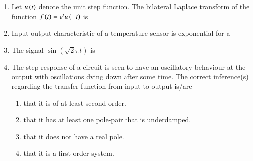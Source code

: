\documentclass[journal,12pt,onecolumn]{IEEEtran}
\theoremstyle{remark}
\begin{document}
\begin{enumerate}
\item Let $u\left(t\right)$ denote the unit step function. The bilateral Laplace transform of the function $f\left(t\right) = e^t u\left(-t\right)$ is \par \hfill{}
\begin{enumerate}
\end{enumerate}


\item Input-output characteristic of a temperature sensor is exponential for a \par \hfill{}
\begin{enumerate}
\end{enumerate}

\item The signal $\sin(\sqrt{2}\pi t)$ is \par \hfill{}
\begin{enumerate}
\end{enumerate}


\item The step response of a circuit is seen to have an oscillatory behaviour at the output with oscillations dying down after some time. The correct inference(s) regarding the transfer function from input to output is/are \par \hfill{}
\begin{enumerate}
\item that it is of at least second order.
\item that it has at least one pole-pair that is underdamped.
\item that it does not have a real pole.
\item that it is a first-order system.
\end{enumerate}


\end{enumerate}
\end{document}
